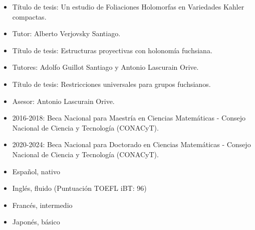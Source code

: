\documentclass[10pt,a4paper,ragged2e,withhyper]{altacv}
\begin{document}
\begin{paracol}{2}
\begin{itemize}
\item Título de tesis: Un estudio de Foliaciones Holomorfas en Variedades Kahler compactas.
\item Tutor: Alberto Verjovsky Santiago.
\end{itemize}

\divider

\begin{itemize}
\item Título de tesis: Estructuras proyectivas con holonomía fuchsiana.
\item Tutores: Adolfo Guillot Santiago y Antonio Lascurain Orive.
\end{itemize}

\divider

\begin{itemize}
\item Título de tesis: Restricciones universales para grupos fuchsianos.
\item Asesor: Antonio Lascurain Orive.
\end{itemize}

\divider

\vspace{1cm}
\begin{itemize}
\item 2016-2018: Beca Nacional para Maestría en Ciencias Matemáticas - Consejo Nacional de Ciencia y Tecnología (CONACyT).
\item 2020-2024: Beca Nacional para Doctorado en Ciencias Matemáticas - Consejo Nacional de Ciencia y Tecnología (CONACyT).
\end{itemize}


\begin{itemize}
\item Español, nativo
\item Inglés, fluido (Puntuación TOEFL iBT: 96)
\item Francés, intermedio
\item Japonés, básico
\end{itemize}


\end{paracol}
\end{document}
